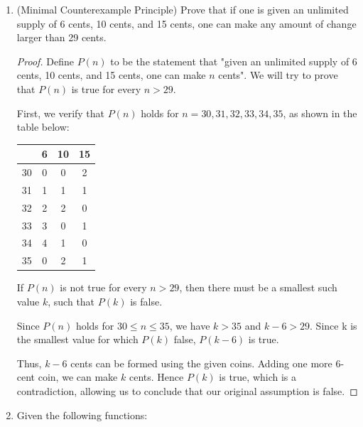 \documentclass[12pt,a4paper]{article}
\theoremstyle{definition}
\begin{document}
\begin{enumerate}
    \item {\color{purple}(Minimal Counterexample Principle)}
    Prove that if one is given an unlimited supply of 6 cents, 10 cents, and 15 cents, one can make any amount of change larger than 29 cents.

\begin{proof}
    
    Define $P(n)$ to be the statement that "given an unlimited supply of 6 cents, 10 cents, and 15 cents, one can make $n$ cents". We will try to prove that $P(n)$ is true for every $n > 29$.
    

    First, we verify that $P(n)$ holds for $n = 30,31,32,33,34,35$, as shown in the table below:
    
    \begin{center}
    \begin{tabular}{c c c c} 
    \hline
            \ & 6 & 10 & 15\\
    \hline
            30 & 0 & 0 & 2\\
    \hline
            31 & 1 & 1 & 1\\
    \hline
            32 & 2 & 2 & 0\\
    \hline
            33 & 3 & 0 & 1\\
    \hline
            34 & 4 & 1 & 0\\
    \hline
            35 & 0 & 2 & 1\\
    \hline
    \end{tabular}
    \end{center}

    If $P(n)$ is not true for every $n > 29$, then there must be a smallest such value $k$, such that $P(k)$ is false.
    
    Since $P(n)$ holds for $30 \le n \le 35$, we have $k > 35$ and $k-6 > 29$. Since k is the smallest value for which $P(k)$ false, $P(k-6)$ is true.

    Thus, $k-6$ cents can be formed using the given coins. Adding one more 6-cent coin, we can make $k$ cents. Hence $P(k)$ is true, which is a contradiction, allowing us to conclude that our original assumption is false.

\end{proof}
    

    \smallskip
    \item {\color{purple}{(Complexity Class)}}  
    Given the following functions:
    

\end{enumerate}
\end{document}
